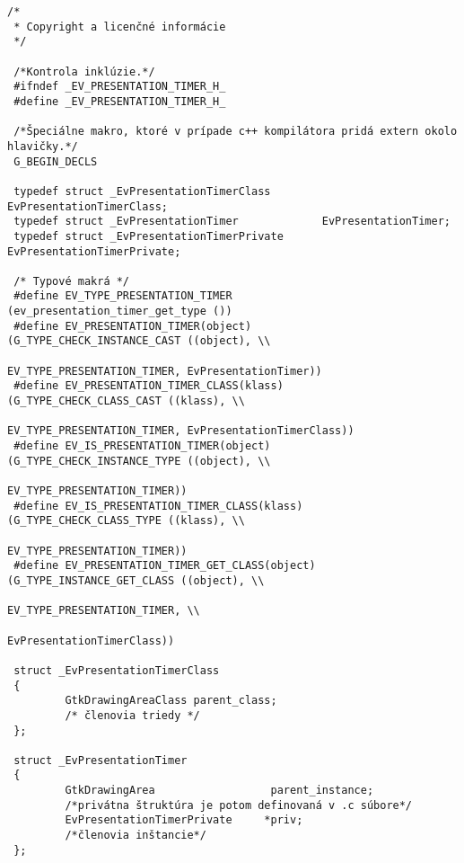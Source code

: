 \documentclass[12pt,oneside,final]{fithesis2}
\begin{document}
\begin{tiny}
\begin{verbatim}
/*
 * Copyright a licenčné informácie
 */
 
 /*Kontrola inklúzie.*/
 #ifndef _EV_PRESENTATION_TIMER_H_
 #define _EV_PRESENTATION_TIMER_H_
 
 /*Špeciálne makro, ktoré v prípade c++ kompilátora pridá extern okolo hlavičky.*/
 G_BEGIN_DECLS
 
 typedef struct _EvPresentationTimerClass        EvPresentationTimerClass;
 typedef struct _EvPresentationTimer             EvPresentationTimer;
 typedef struct _EvPresentationTimerPrivate      EvPresentationTimerPrivate;
 
 /* Typové makrá */
 #define EV_TYPE_PRESENTATION_TIMER              (ev_presentation_timer_get_type ())
 #define EV_PRESENTATION_TIMER(object)           (G_TYPE_CHECK_INSTANCE_CAST ((object), \\
                                                  EV_TYPE_PRESENTATION_TIMER, EvPresentationTimer))
 #define EV_PRESENTATION_TIMER_CLASS(klass)      (G_TYPE_CHECK_CLASS_CAST ((klass), \\
                                                  EV_TYPE_PRESENTATION_TIMER, EvPresentationTimerClass))
 #define EV_IS_PRESENTATION_TIMER(object)        (G_TYPE_CHECK_INSTANCE_TYPE ((object), \\
                                                  EV_TYPE_PRESENTATION_TIMER))
 #define EV_IS_PRESENTATION_TIMER_CLASS(klass)   (G_TYPE_CHECK_CLASS_TYPE ((klass), \\
                                                  EV_TYPE_PRESENTATION_TIMER))
 #define EV_PRESENTATION_TIMER_GET_CLASS(object) (G_TYPE_INSTANCE_GET_CLASS ((object), \\
                                                  EV_TYPE_PRESENTATION_TIMER, \\
                                                  EvPresentationTimerClass))
 
 struct _EvPresentationTimerClass
 {
         GtkDrawingAreaClass parent_class;
         /* členovia triedy */
 };
 
 struct _EvPresentationTimer
 {
         GtkDrawingArea                  parent_instance;
         /*privátna štruktúra je potom definovaná v .c súbore*/
         EvPresentationTimerPrivate     *priv;
         /*členovia inštancie*/
 };
 

\end{verbatim}
\end{tiny}
\end{document}
